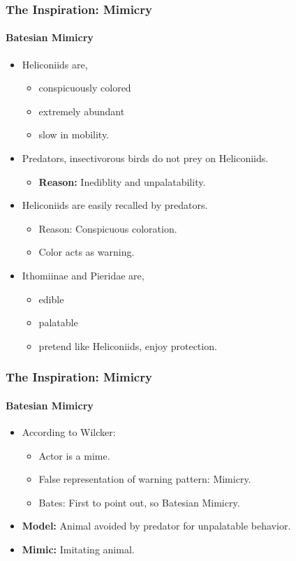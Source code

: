 \frame
{
	\frametitle{The Inspiration: Mimicry}
	\framesubtitle{Batesian Mimicry}
	
	\begin{itemize}
		\item Heliconiids are,
			\begin{itemize}
				\item conspicuously colored
				\item extremely abundant 
				\item slow in mobility.
			\end{itemize}
		\item Predators, insectivorous birds do not prey on Heliconiids.
			\begin{itemize}
				\item \textbf{Reason:} Inediblity and unpalatability.
			\end{itemize}
		\item Heliconiids are easily recalled by predators. 
			\begin{itemize}
				\item Reason: Conspicuous coloration.
				\item Color acts as warning.
			\end{itemize}
		\item Ithomiinae and Pieridae are,
			\begin{itemize}
				\item edible 
				\item palatable
				\item pretend like Heliconiids, enjoy protection.
			\end{itemize}
	\end{itemize}
}

\frame
{
	\frametitle{The Inspiration: Mimicry}
	\framesubtitle{Batesian Mimicry}
	
	\begin{itemize}
		\item According to Wilcker:
			\begin{itemize}
				\item Actor is a mime.
				\item False representation of warning pattern: Mimicry.
				\item Bates: First to point out, so Batesian Mimicry.
			\end{itemize}
		\item \textbf{Model:} Animal avoided by predator for unpalatable behavior.
		\item \textbf{Mimic:} Imitating animal.
	\end{itemize}
}

